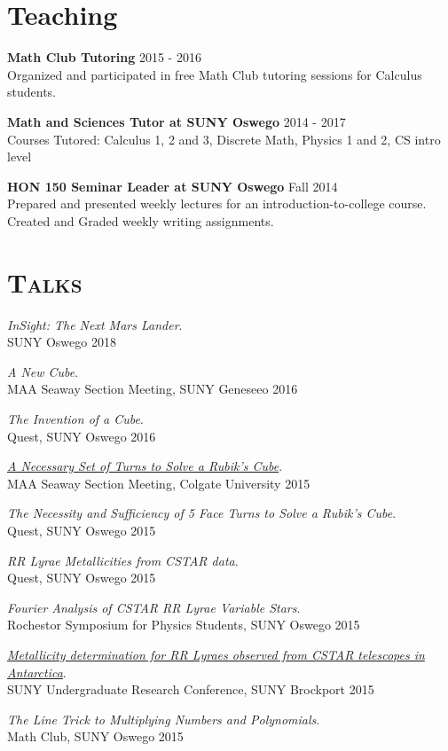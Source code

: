 \documentclass[8pt]{article}
\renewenvironment{itemize}{
  \begin{list}{}{
    \setlength{\leftmargin}{1.5em}
  }
}{
  \end{list}
}
\begin{document}
\section*{Teaching}
\begin{itemize}
\item \textbf{Math Club Tutoring} \hfill 2015 - 2016\\
Organized and participated in free Math Club tutoring sessions for Calculus students.
\item \textbf{Math and Sciences Tutor at SUNY Oswego} \hfill 2014 - 2017\\
Courses Tutored: Calculus 1, 2 and 3, Discrete Math, Physics 1 and 2, CS intro level
\item \textbf{HON 150 Seminar Leader at SUNY Oswego} \hfill Fall 2014\\
Prepared and presented weekly lectures for an introduction-to-college course. Created and Graded weekly writing assignments.
\end{itemize}

\section*{\textsc{Talks}}

\begin{itemize}
\item \emph{InSight: The Next Mars Lander}. \\
SUNY Oswego \hfill 2018
\item \emph{A New Cube}. \\
  MAA Seaway Section Meeting, SUNY Geneseeo \hfill 2016
\item \emph{The Invention of a Cube}.\\
  Quest, SUNY Oswego \hfill 2016
\item \href{http://kroffo.github.io/presentations/SeawaySpr15.pdf}{\emph{A Necessary Set of Turns to Solve a Rubik's Cube}}.\\
  MAA Seaway Section Meeting, Colgate University \hfill 2015
\item \emph{The Necessity and Sufficiency of 5 Face Turns to Solve a Rubik's Cube}.\\
  Quest, SUNY Oswego \hfill 2015
\item \emph{RR Lyrae Metallicities from CSTAR data}.\\
  Quest, SUNY Oswego \hfill 2015
\item \emph{Fourier Analysis of CSTAR RR Lyrae Variable Stars}.\\
  Rochestor Symposium for Physics Students, SUNY Oswego \hfill 2015
\item \href{http://kroffo.github.io/presentations/RRLyraeMetallicity2015.pdf}{\emph{Metallicity determination for RR Lyraes observed from CSTAR telescopes in Antarctica}}.\\
  SUNY Undergraduate Research Conference, SUNY Brockport \hfill 2015
\item \emph{The Line Trick to Multiplying Numbers and Polynomials}.\\
  Math Club, SUNY Oswego \hfill 2015

\end{itemize}
\end{document}
